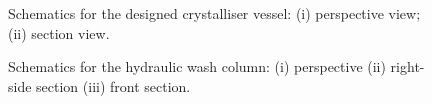 \begin{figure}[h]
    \centering
    
    \caption{Schematics for the designed crystalliser vessel: (i) perspective view; (ii) section view.}
    \label{fig:crystalliser schematic executive}
\end{figure}

\begin{figure}[h]
    \centering
    
    \caption{Schematics for the hydraulic wash column: (i) perspective (ii) right-side section (iii) front section.}
    \label{fig:wash column schematic executive}
\end{figure}
